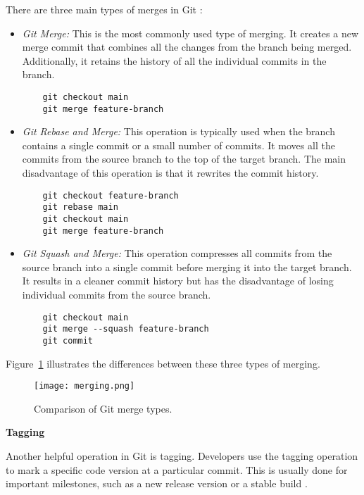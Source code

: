 There are three main types of merges in Git \cite{git}:

\begin{itemize}
    \item \textit{Git Merge:} This is the most commonly used type of merging. It creates a new merge commit that combines all the changes from the branch being merged. Additionally, it retains the history of all the individual commits in the branch.
    \begin{verbatim}
    git checkout main
    git merge feature-branch
    \end{verbatim}

    \item \textit{Git Rebase and Merge:} This operation is typically used when the branch contains a single commit or a small number of commits. It moves all the commits from the source branch to the top of the target branch. The main disadvantage of this operation is that it rewrites the commit history.
    \begin{verbatim}
    git checkout feature-branch
    git rebase main
    git checkout main
    git merge feature-branch
    \end{verbatim}

    \item \textit{Git Squash and Merge:} This operation compresses all commits from the source branch into a single commit before merging it into the target branch. It results in a cleaner commit history but has the disadvantage of losing individual commits from the source branch.
    \begin{verbatim}
    git checkout main
    git merge --squash feature-branch
    git commit
    \end{verbatim}
\end{itemize}


Figure~\ref{fig:merging} illustrates the differences between these three types of merging. 

\begin{figure}[h!]
    \centering
    \texttt{[image: merging.png]}
    \caption{Comparison of Git merge types.}
    \label{fig:merging}
\end{figure}

\textbf{Tagging}

Another helpful operation in Git is tagging. Developers use the tagging operation to mark a specific code version at a particular commit. This is usually done for important milestones, such as a new release version or a stable build \cite{git}.

